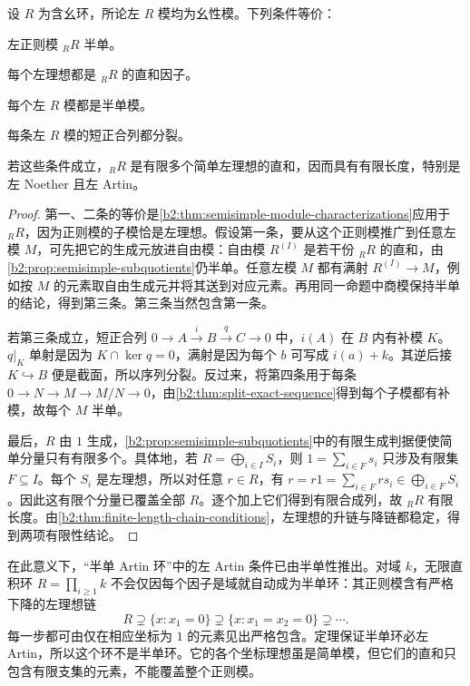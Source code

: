 \begin{theorem}\label{b2:thm:semisimple-ring-characterizations}
	设 \(R\) 为含幺环，所论左 \(R\) 模均为幺性模。下列条件等价：
	\begin{equivalences}
		\item 左正则模 \({}_RR\) 半单。
		\item 每个左理想都是 \({}_RR\) 的直和因子。
		\item 每个左 \(R\) 模都是半单模。
		\item 每条左 \(R\) 模的短正合列都分裂。
	\end{equivalences}
	若这些条件成立，\({}_RR\) 是有限多个简单左理想的直和，因而具有有限长度，特别是左 Noether 且左 Artin。
\end{theorem}
\begin{proof}
	第一、二条的等价是\cref{b2:thm:semisimple-module-characterizations}应用于 \({}_RR\)，因为正则模的子模恰是左理想。假设第一条，要从这个正则模推广到任意左模 \(M\)，可先把它的生成元放进自由模：自由模 \(R^{(I)}\) 是若干份 \({}_RR\) 的直和，由\cref{b2:prop:semisimple-subquotients}仍半单。任意左模 \(M\) 都有满射 \(R^{(I)}\to M\)，例如按 \(M\) 的元素取自由生成元并将其送到对应元素。再用同一命题中商模保持半单的结论，得到第三条。第三条当然包含第一条。

	若第三条成立，短正合列 \(0\to A\xrightarrow{i}B\xrightarrow{q}C\to0\) 中，\(i(A)\) 在 \(B\) 内有补模 \(K\)。\(q|_K\) 单射是因为 \(K\cap\ker q=0\)，满射是因为每个 \(b\) 可写成 \(i(a)+k\)。其逆后接 \(K\hookrightarrow B\) 便是截面，所以序列分裂。反过来，将第四条用于每条 \(0\to N\to M\to M/N\to0\)，由\cref{b2:thm:split-exact-sequence}得到每个子模都有补模，故每个 \(M\) 半单。

	最后，\(R\) 由 \(1\) 生成，\cref{b2:prop:semisimple-subquotients}中的有限生成判据便使简单分量只有有限多个。具体地，若 \(R=\bigoplus_{i\in I}S_i\)，则 \(1=\sum_{i\in F}s_i\) 只涉及有限集 \(F\subseteq I\)。每个 \(S_i\) 是左理想，所以对任意 \(r\in R\)，有 \(r=r1=\sum_{i\in F}rs_i\in\bigoplus_{i\in F}S_i\)。因此这有限个分量已覆盖全部 \(R\)。逐个加上它们得到有限合成列，故 \({}_RR\) 有限长度。由\cref{b2:thm:finite-length-chain-conditions}，左理想的升链与降链都稳定，得到两项有限性结论。
\end{proof}

在此意义下，“半单 Artin 环”中的左 Artin 条件已由半单性推出。对域 \(k\)，无限直积环 \(R=\prod_{i\ge1}k\) 不会仅因每个因子是域就自动成为半单环：其正则模含有严格下降的左理想链
\[
	R\supsetneq\{x:x_1=0\}\supsetneq \{x:x_1=x_2=0\}\supsetneq\cdots.
\]
每一步都可由仅在相应坐标为 \(1\) 的元素见出严格包含。定理保证半单环必左 Artin，所以这个环不是半单环。它的各个坐标理想虽是简单模，但它们的直和只包含有限支集的元素，不能覆盖整个正则模。

